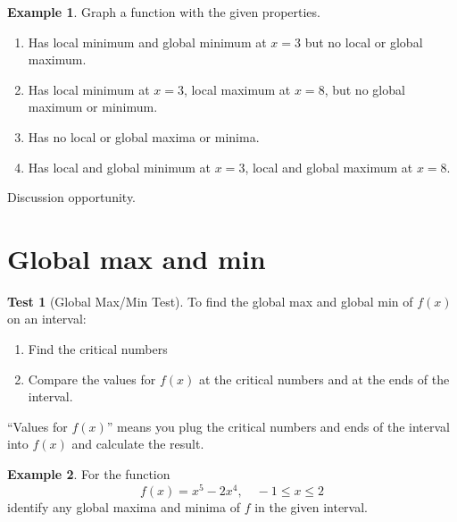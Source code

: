 \documentclass[oneside]{book}
\theoremstyle{definition}
\newtheorem{example}{Example}
\newtheorem{test}[definition]{Test}
\theoremstyle{solution}
\newtheorem*{solution}{Solution}
\newenvironment{solution}{\vspace{2in}\comment}{\endcomment}
\begin{document}
\begin{example}
Graph a function with the given properties.
\begin{enumerate}
\item Has local minimum and global minimum at $x = 3$ but no local or
  global maximum.
\item Has local minimum at $x = 3$, local maximum at $x = 8$, but no
  global maximum or minimum.
\item Has no local or global maxima or minima.
\item Has local and global minimum at $x = 3$, local and global
  maximum at $x = 8$.
\end{enumerate}
\end{example}

\begin{solution}
Discussion opportunity.
\end{solution}


\section{Global max and min}

\begin{test}[Global Max/Min Test]
To find the global max and global min of $f(x)$ on an interval:
\begin{enumerate}
\item Find the critical numbers

\item Compare the values for $f(x)$ at the critical numbers and at the
  ends of the interval.
\end{enumerate}
\bigskip

``Values for $f(x)$'' means you plug the critical numbers and ends of
the interval into $f(x)$ and calculate the result.
\end{test}



\begin{example}
  For the function
  $$ 
  f(x) = x^5 - 2x^4, \quad -1 \le x \le 2
  $$
  identify any global maxima and minima of $f$ in the given interval.
\end{example}
\end{document}
